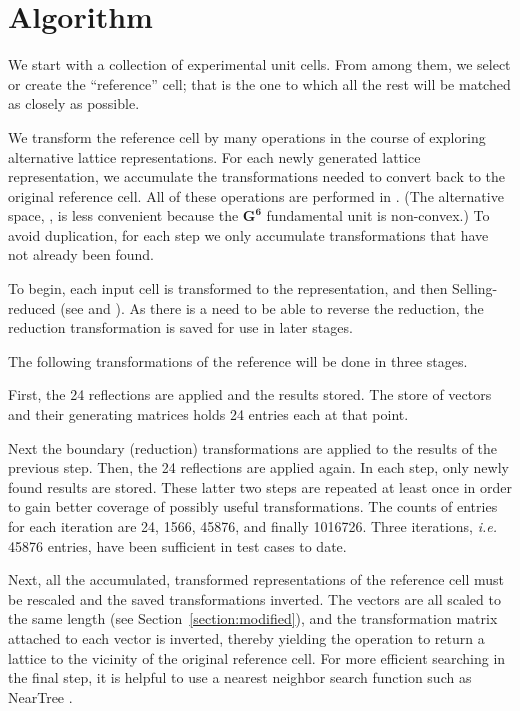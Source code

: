 \documentclass[preprint]{iucr}              %
\numberwithin{equation}{section}
\numberwithin{equation}{section}
\begin{document}
	\section{Algorithm}
	
	We start with a collection of experimental unit cells. From among them, we select or create the
	``reference'' cell; that is the one to which all the rest will be matched as closely as possible.
	
	We transform the reference cell by many operations in the course of exploring alternative
	lattice representations. For each newly
	generated lattice representation, we accumulate the transformations needed to convert  back to the 
	original reference cell.  All of these operations are
	performed in \SVI{}. (The alternative space, \GVI{}, is less convenient
	because the $ \mathbf{G^6}$ fundamental unit is non-convex.) To avoid duplication, for each step 
	we only accumulate transformations
	that have not already been found. 
	
	To begin, each input cell is transformed to the \SVI{} representation, and then 
	Selling-reduced (see  and ). As
	there is a need to be able to reverse the reduction, the reduction transformation 
	is saved for use in later stages.
	
	The following transformations of the reference will be done in three stages.
	
	First, the 24 \SVI{} reflections are
	applied \cite{Andrews2019b} and the results stored. The store of \SVI{} vectors and their generating matrices holds 24 entries each at that point.
	
	Next the boundary (reduction) transformations \cite{Andrews2019b} are applied to
	the results of the previous step. Then, the 24 reflections are applied again. In
	each step, only newly found results are stored. These latter two steps are repeated 
	at least once in order to gain better coverage of possibly useful transformations. 
	The counts of entries for each iteration are 24, 1566, 45876, and finally 1016726.
	Three iterations, {\it i.e.} 45876 entries, have been sufficient in test cases to date.
	
	Next, all the accumulated, transformed representations of the reference cell must be rescaled and the saved
	transformations inverted.
	The \SVI{} vectors are all scaled to the same length (see Section~\ref{section:modified}), and the transformation matrix
	attached to each vector is inverted, thereby yielding the operation to return a lattice to the vicinity of the
	original reference cell. For more efficient searching in the final step, it is helpful to use
	a nearest neighbor search function such as NearTree \cite{andrews2016}.
	
\end{document}
